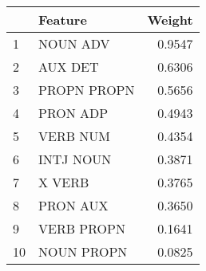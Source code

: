 \begin{tabular}{llr}
\toprule
{} &      Feature &  Weight \\
\midrule
1  &     NOUN ADV &  0.9547 \\
2  &      AUX DET &  0.6306 \\
3  &  PROPN PROPN &  0.5656 \\
4  &     PRON ADP &  0.4943 \\
5  &     VERB NUM &  0.4354 \\
6  &    INTJ NOUN &  0.3871 \\
7  &       X VERB &  0.3765 \\
8  &     PRON AUX &  0.3650 \\
9  &   VERB PROPN &  0.1641 \\
10 &   NOUN PROPN &  0.0825 \\
\bottomrule
\end{tabular}

